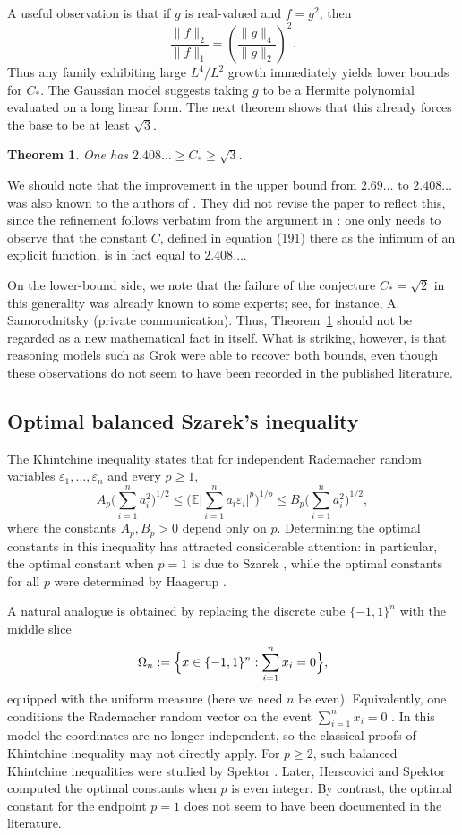 \documentclass[11pt]{article}
\newtheorem{theorem}{Theorem}
\begin{document}
A useful observation is that if \(g\) is real-valued and \(f=g^2\), then
\[
\frac{\|f\|_2}{\|f\|_1}
=
\left(\frac{\|g\|_4}{\|g\|_2}\right)^2.
\]
Thus any family exhibiting large \(L^4/L^2\) growth immediately yields lower bounds for \(C_\ast\). The Gaussian model suggests taking \(g\) to be a Hermite polynomial evaluated on a long linear form. The next theorem shows that this already forces the base to be at least \(\sqrt3\).

\begin{theorem}\label{lem:sqrt3}
One has \(2.408...\geq C_\ast\ge \sqrt3\). 
\end{theorem}

We should note that the improvement in the upper bound from \(2.69\ldots\) to \(2.408\ldots\) was also known to the authors of \cite{EskenazisIvanisvili}. They did not revise the paper to reflect this, since the refinement follows verbatim from the argument in \cite{EskenazisIvanisvili}: one only needs to observe that the constant \(C\), defined in equation (191) there as the infimum of an explicit function, is in fact equal to \(2.408\ldots\).

On the lower-bound side, we note that the failure of the conjecture
\(C_\ast=\sqrt{2}\) in this generality was already known to some experts;
see, for instance, A. Samorodnitsky (private communication). Thus,
Theorem~\ref{lem:sqrt3} should not be regarded as a new mathematical fact
in itself. What is striking, however, is that reasoning models such as
Grok were able to recover both bounds, even though these observations do
not seem to have been recorded in the published literature.

\subsection{Optimal balanced Szarek's inequality}
The Khintchine inequality states that for independent Rademacher random variables
\(\varepsilon_1,\dots,\varepsilon_n\) and every \(p\geq 1\),
\[
A_p\Big(\sum_{i=1}^n a_i^2\Big)^{1/2}
\le
\Big(\mathbb{E}\Big|\sum_{i=1}^n a_i\varepsilon_i\Big|^p\Big)^{1/p}
\le
B_p\Big(\sum_{i=1}^n a_i^2\Big)^{1/2},
\]
where the constants \(A_p,B_p > 0\) depend only on \(p\). Determining the optimal constants in this inequality has attracted considerable attention: in
particular, the optimal constant when $p=1$ is due to Szarek \cite{Szarek76}, while the optimal constants for all $p$ were determined by Haagerup \cite{Haagerup81}.

A natural analogue is obtained by replacing the discrete cube \(\{-1,1\}^n\) with the middle
slice
\[
\Omega_n:=\Bigl\{x\in\{-1,1\}^n:\sum_{i=1}^n x_i=0\Bigr\},
\]
equipped with the uniform measure (here we need $n$ be even). Equivalently, one conditions the Rademacher random vector on the
event \(\sum_{i=1}^n x_i=0\) . In this model the coordinates are no longer independent, so the
classical proofs of Khintchine inequality may not directly apply. For \(p\ge 2\), such balanced Khintchine inequalities were studied by Spektor
\cite{Spektor16}. Later, Herscovici and Spektor \cite{HerscoviciSpektor20} computed the optimal constants when $p$ is even integer. By
contrast, the optimal constant for the endpoint \(p=1\) does not seem to have been documented in the literature. 
\end{document}
